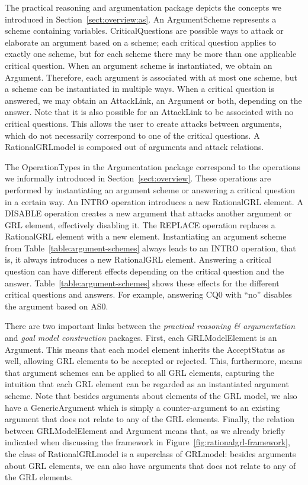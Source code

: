 The practical reasoning and argumentation package depicts the concepts we introduced in Section~\ref{sect:overview:as}. An \textsf{ArgumentScheme} represents a scheme containing variables. \textsf{CriticalQuestions} are possible ways to attack or elaborate an argument based on a scheme; each critical question applies to exactly one scheme, but for each scheme there may be more than one applicable critical question. When an argument scheme is instantiated, we obtain an \textsf{Argument}. Therefore, each argument is associated with at most one scheme, but a scheme can be instantiated in multiple ways. When a critical question is answered, we may obtain an \textsf{AttackLink}, an \textsf{Argument} or both, depending on the answer. Note that it is also possible for an \textsf{AttackLink} to be associated with no critical questions. This allows the user to create attacks between arguments, which do not necessarily correspond to one of the critical questions. A \textsf{RationalGRLmodel} is composed out of arguments and attack relations.

The \textsf{OperationTypes} in the Argumentation package correspond to the operations we informally introduced in Section~\ref{sect:overview}. These operations are performed by instantiating an argument scheme or answering a critical question in a certain way. An \textsf{INTRO} operation introduces a new RationalGRL element. A \textsf{DISABLE} operation creates a new argument that attacks another argument or GRL element, effectively disabling it. The \textsf{REPLACE} operation replaces a RationalGRL element with a new element. Instantiating an argument scheme from Table~\ref{table:argument-schemes} always leads to an \textsf{INTRO} operation, that is, it always introduces a new RationalGRL element. Answering a critical question can have different effects depending on the critical question and the answer. Table~\ref{table:argument-schemes} shows these effects for the different critical questions and answers. For example, answering CQ0 with ``no'' disables the argument based on AS0. 

There are two important links between the \emph{practical reasoning \& argumentation} and \emph{goal model construction} packages. First, each \textsf{GRLModelElement} is an \textsf{Argument}. This means that each model element inherits the \textsf{AcceptStatus} as well, allowing GRL elements to be accepted or rejected. This, furthermore, means that argument schemes can be applied to all GRL elements, capturing the intuition that each GRL element can be regarded as an instantiated argument scheme. Note that besides arguments about elements of the GRL model, we also have a \textsf{GenericArgument} which is simply a counter-argument to an existing argument that does not relate to any of the GRL elements. Finally, the relation between \textsf{GRLModelElement} and \textsf{Argument} means that, as we already briefly indicated when discussing the framework in Figure~\ref{fig:rationalgrl-framework}, the class of \textsf{RationalGRLmodel} is a superclass of \textsf{GRLmodel}: besides arguments about GRL elements, we can also have arguments that does not relate to any of the GRL elements.

